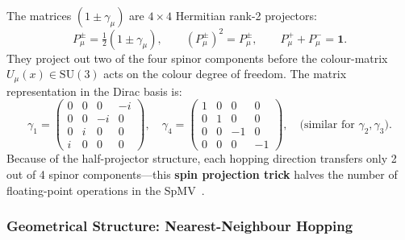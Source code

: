 \documentclass[12pt,a4paper]{article}
\begin{document}
The matrices $(1 \pm \gamma_\mu)$ are $4\times4$ Hermitian rank-2 projectors:
\begin{equation}
  P_\mu^\pm = \tfrac{1}{2}(1\pm\gamma_\mu),
  \qquad (P_\mu^\pm)^2 = P_\mu^\pm, \qquad
  P_\mu^+ + P_\mu^- = \mathbf{1}.
  \label{eq:projectors}
\end{equation}
They project out two of the four spinor components before the colour-matrix
$U_\mu(x)\in\mathrm{SU}(3)$ acts on the colour degree of freedom.
The matrix representation in the Dirac basis is:
\begin{equation}
  \gamma_1 = \begin{pmatrix}0 & 0 & 0 & -i \\ 0 & 0 & -i & 0 \\ 0 & i & 0 & 0 \\ i & 0 & 0 & 0\end{pmatrix},\quad
  \gamma_4 = \begin{pmatrix}1 & 0 & 0 & 0 \\ 0 & 1 & 0 & 0 \\ 0 & 0 & -1 & 0 \\ 0 & 0 & 0 & -1\end{pmatrix},
  \quad \text{(similar for }\gamma_2,\gamma_3\text{)}.
\end{equation}
Because of the half-projector structure, each hopping direction transfers only
2 out of 4 spinor components---this \textbf{spin projection trick} halves the
number of floating-point operations in the SpMV~\cite{Akahoshi2022}.

\subsubsection{Geometrical Structure: Nearest-Neighbour Hopping}
\end{document}

